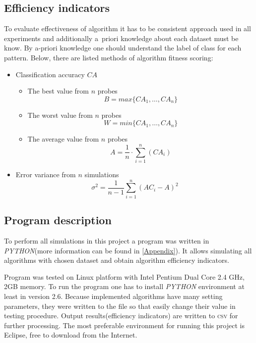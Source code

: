\subsection{Efficiency indicators}
\label{cha:indicators}
To evaluate effectiveness of algorithm it has to be consistent approach used in
all experiments and additionally a~priori knowledge about each dataset must
be know. By a-priori knowledge one should understand the label of class for
each pattern. Below, there are listed methods of algorithm fitness scoring:
\begin{itemize}
	\item Classification accuracy $CA$
		\begin{itemize}
			\item The best value from $n$ probes 
				\begin{equation}
                    B=max\{CA_1, \ldots, CA_n\}
					\label{min1}
				\end{equation}
			\item The worst value from $n$ probes 
				\begin{equation}
                    W=min\{CA_1, \ldots, CA_n\}
					\label{min3}
				\end{equation}
			\item The average value from $n$ probes
				\begin{equation}
                    A=\frac{1}{n}\cdot\sum\limits_{i=1}^{n} (CA_i)
					\label{min2}
				\end{equation}
		\end{itemize}
	\item Error variance from $n$ simulations 
		\begin{equation}
			\sigma^2=\frac{1}{n-1}\sum\limits_{i=1}^n(AC_i-A)^2
			\label{min4}
		\end{equation}
\end{itemize}
\subsection{Program description}
To perform all simulations in this project a program was written in
\textit{PYTHON}(more information can be found in \ref{Appendix}). 
It allows simulating all algorithms with chosen dataset and obtain
algorithm efficiency indicators. 

Program was tested on Linux platform with Intel Pentium Dual Core 2.4 GHz, 2GB
memory. To run the program one has to install \textit{PYTHON} environment at
least in version 2.6. Because implemented algorithms have many setting parameters, 
they were written to the file so that easily change their value in testing procedure. 
Output results(efficiency indicators) are written to \textsc{csv} for further
processing. The most preferable environment for running this project is
Eclipse, free to download from the Internet.
